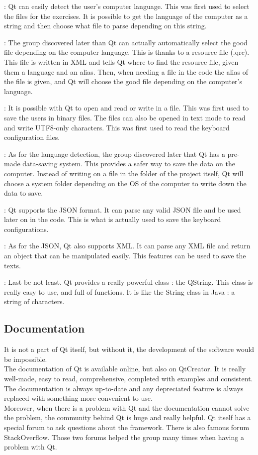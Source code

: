 \begin{description}[align=left]
	\item[Language detection] : Qt can easily detect the user's computer language. This was first used to select the files for the exercises. It is possible to get the language of the computer as a string and then choose what file to parse depending on this string.
	\item[Resources files] : The group discovered later than Qt can actually automatically select the good file depending on the computer language. This is thanks to a resource file (.qrc). This file is written in XML and tells Qt where to find the resource file, given them a language and an alias. Then, when needing a file in the code the alias of the file is given, and Qt will choose the good file depending on the computer's language.
	\item[DataStream] : It is possible with Qt to open and read or write in a file. This was first used to save the users in binary files. The files can also be opened in text mode to read and write UTF8-only characters. This was first used to read the keyboard configuration files.
	\item[QSettings] : As for the language detection, the group discovered later that Qt has a pre-made data-saving system. This provides a safer way to save the data on the computer. Instead of writing on a file in the folder of the project itself, Qt will choose a system folder depending on the OS of the computer to write down the data to save.
	\item[Json] : Qt supports the JSON format. It can parse any valid JSON file and be used later on in the code. This is what is actually used to save the keyboard configurations. 
	\item[XML] : As for the JSON, Qt also supports XML. It can parse any XML file and return an object that can be manipulated easily. This features can be used to save the texts.
	\item[QString] : Last be not least. Qt provides a really powerful class : the QString. This class is really easy to use, and full of functions. It is like the String class in Java : a string of characters.
\end{description}

\subsection{Documentation}
It is not a part of Qt itself, but without it, the development of the software would be impossible.\\
The documentation of Qt is available online, but also on QtCreator. It is really well-made, easy to read, comprehensive, completed with examples and consistent. The documentation is always up-to-date and any depreciated feature is always replaced with something more convenient to use.\\
Moreover, when there is a problem with Qt and the documentation cannot solve the problem, the community behind Qt is huge and really helpful. Qt itself has a special forum to ask questions about the framework. There is also famous forum StackOverflow. Those two forums helped the group many times when having a problem with Qt.

